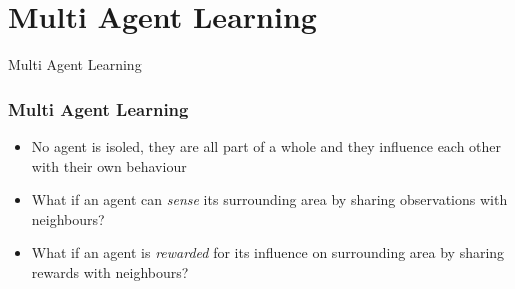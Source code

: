 \documentclass[dvipsnames]{beamer}
\begin{document}
\section{Multi Agent Learning}
\begin{frame}
\centering
\Huge
Multi Agent Learning
\end{frame}

\begin{frame}
\frametitle{Multi Agent Learning}

  {\footnotesize
  \begin{itemize}
    \item No agent is isoled, they are all part of a whole and they influence each other with their own behaviour
    \item What if an agent can \textit{sense} its surrounding area by sharing observations with neighbours?
    \item What if an agent is \textit{rewarded} for its influence on surrounding area by sharing rewards with neighbours?
  \end{itemize}
  }


\end{frame}
\end{document}
